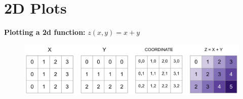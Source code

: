 \documentclass[12pt]{article}
\numberwithin{equation}{section}
\begin{document}
\section{2D Plots}

\textbf{Plotting a 2d function: }$z(x,y) = x+y$

\begin{figure}[H]
	    \centering
	    \includegraphics[width=15cm] {im}
\end{figure}
\end{document}
